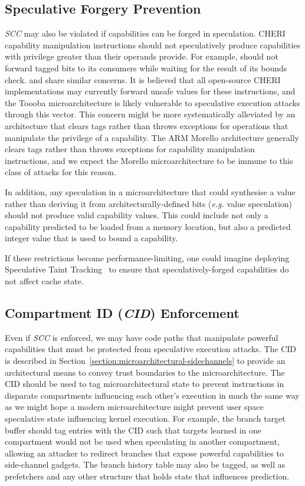 \subsection{Speculative Forgery Prevention}
\emph{SCC} may also be violated if capabilities can be forged in speculation.
CHERI capability manipulation instructions should not speculatively produce capabilities with privilege greater than their operands provide.
For example,  should not forward tagged bits to its consumers while waiting for the result of its bounds check.
 and  share similar concerns.
It is believed that all open-source CHERI implementations may currently forward unsafe values for these instructions, and the Toooba microarchitecture is likely vulnerable to speculative execution attacks through this vector.
This concern might be more systematically alleviated by an architecture that clears tags rather than throws exceptions for operations that manipulate the privilege of a capability. The ARM Morello architecture generally clears tags rather than throws exceptions for capability manipulation instructions, and we expect the Morello microarchitecture to be immune to this class of attacks for this reason.

In addition, any speculation in a microarchitecture that could synthesise a value rather than deriving it from architecturally-defined bits (\textit{e.g.} value speculation) should not produce valid capability values.
This could include not only a capability predicted to be loaded from a memory location, but also a predicted integer value that is used to bound a capability.

If these restrictions become performance-limiting, one could imagine deploying Speculative Taint Tracking~\cite{yu2019speculative} to ensure that speculatively-forged capabilities do not affect cache state.

\subsection{Compartment ID (\emph{CID}) Enforcement}
Even if \emph{SCC} is enforced, we may have code paths that manipulate powerful capabilities that must be protected from speculative execution attacks.
The CID is described in Section~\ref{section:microarchitectural-sidechannels} to provide an architectural means to convey trust boundaries to the microarchitecture.
The CID should be used to tag microarchitectural state to prevent instructions in disparate compartments influencing each other's execution in much the same way as we might hope a modern microarchitecture might prevent user space speculative state influencing kernel execution.
For example, the branch target buffer should tag entries with the CID such that targets learned in one compartment would not be used when speculating in another compartment, allowing an attacker to redirect branches that expose powerful capabilities to side-channel gadgets.
The branch history table may also be tagged, as well as prefetchers and any other structure that holds state that influences prediction.

